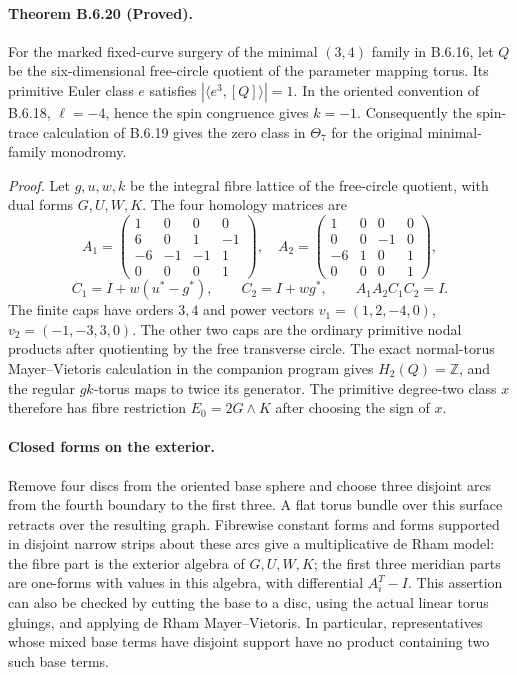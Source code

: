 \paragraph{Theorem B.6.20 (Proved).}
For the marked fixed-curve surgery of the minimal $(3,4)$ family in
B.6.16, let $Q$ be the six-dimensional free-circle quotient of the
parameter mapping torus. Its primitive Euler class $e$ satisfies
$|\langle e^3,[Q]\rangle|=1$. In the oriented convention of B.6.18,
$\ell=-4$, hence the spin congruence gives $k=-1$.
Consequently the spin-trace calculation of B.6.19 gives the zero class
in $\Theta_7$ for the original minimal-family monodromy.

\emph{Proof.}
Let $g,u,w,k$ be the integral fibre lattice of the free-circle quotient,
with dual forms $G,U,W,K$.  The four homology matrices are
\[
 A_1=\begin{pmatrix}1&0&0&0\\6&0&1&-1\\-6&-1&-1&1\\0&0&0&1\end{pmatrix},\quad
 A_2=\begin{pmatrix}1&0&0&0\\0&0&-1&0\\-6&1&0&1\\0&0&0&1\end{pmatrix},
\]
\[
 C_1=I+w(u^*-g^*),\qquad C_2=I+wg^*,\qquad A_1A_2C_1C_2=I.
\]
The finite caps have orders $3,4$ and power vectors
$v_1=(1,2,-4,0)$, $v_2=(-1,-3,3,0)$.
The other two caps are the ordinary primitive nodal products after
quotienting by the free transverse circle. The exact normal-torus
Mayer--Vietoris calculation in the companion program gives
$H_2(Q)=\mathbb Z$, and the regular $gk$-torus maps to twice its generator.
The primitive degree-two class $x$ therefore has fibre restriction
$E_0=2G\wedge K$ after choosing the sign of $x$.

\paragraph{Closed forms on the exterior.}
Remove four discs from the oriented base sphere and choose three disjoint
arcs from the fourth boundary to the first three.  A flat torus bundle over
this surface retracts over the resulting graph. Fibrewise constant forms
and forms supported in disjoint narrow strips about these arcs give a
multiplicative de Rham model: the fibre part is the exterior algebra of
$G,U,W,K$; the first three meridian parts are one-forms with values in this
algebra, with differential $A_i^T-I$.  This assertion can also be checked
by cutting the base to a disc, using the actual linear torus gluings, and
applying de Rham Mayer--Vietoris. In particular, representatives whose
mixed base terms have disjoint support have no product containing two
such base terms.

